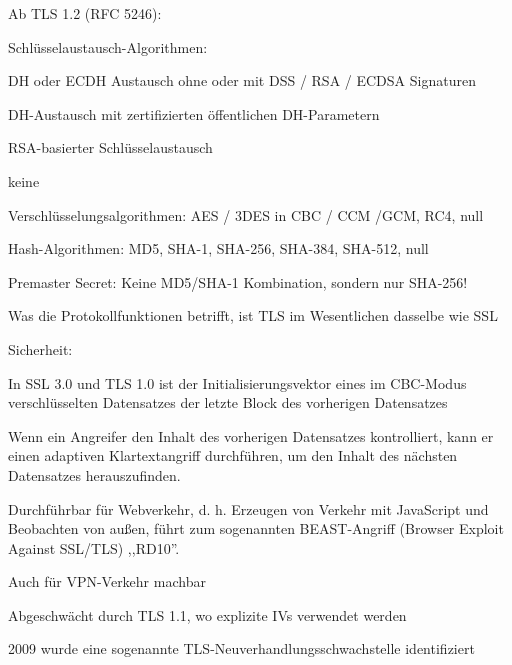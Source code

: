 \documentclass[a4paper]{article}
\begin{document}
\begin{multicols}{3}
\begin{itemize*}
            \item Ab TLS 1.2 (RFC 5246):
            \begin{itemize*}
                  \item Schlüsselaustausch-Algorithmen:
                  \begin{itemize*}
                        \item DH oder ECDH Austausch ohne oder mit DSS / RSA / ECDSA Signaturen
                        \item DH-Austausch mit zertifizierten öffentlichen DH-Parametern
                        \item RSA-basierter Schlüsselaustausch
                        \item keine
                  \end{itemize*}
                  \item Verschlüsselungsalgorithmen: AES / 3DES in CBC / CCM /GCM, RC4, null
                  \item Hash-Algorithmen: MD5, SHA-1, SHA-256, SHA-384, SHA-512, null
                  \item Premaster Secret: Keine MD5/SHA-1 Kombination, sondern nur SHA-256!
            \end{itemize*}
            \item Was die Protokollfunktionen betrifft, ist TLS im Wesentlichen dasselbe wie SSL
            \item Sicherheit:
            \begin{itemize*}
                  \item In SSL 3.0 und TLS 1.0 ist der Initialisierungsvektor eines im CBC-Modus verschlüsselten Datensatzes der letzte Block des vorherigen Datensatzes
                  \item Wenn ein Angreifer den Inhalt des vorherigen Datensatzes kontrolliert, kann er einen adaptiven Klartextangriff durchführen, um den Inhalt des nächsten Datensatzes herauszufinden.
                  \item Durchführbar für Webverkehr, d. h. Erzeugen von Verkehr mit JavaScript und Beobachten von außen, führt zum sogenannten BEAST-Angriff (Browser Exploit Against SSL/TLS) ,,RD10''.
                  \item Auch für VPN-Verkehr machbar
                  \item Abgeschwächt durch TLS 1.1, wo explizite IVs verwendet werden
                  \item 2009 wurde eine sogenannte TLS-Neuverhandlungsschwachstelle identifiziert

\end{itemize*}
\end{itemize*}
\end{multicols}
\end{document}
